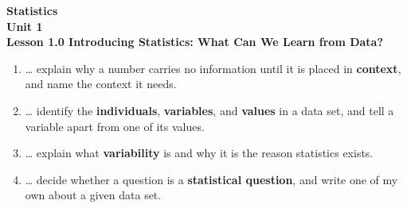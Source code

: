 \documentclass[10pt]{article}
\begin{document}
\vspace{-0.8in}

\begin{center}
  {\color{white}\textbf{\LARGE Statistics}}\\[4pt]
  {\color{skymid}\large\textbf{Unit 1}}\\[6pt]
  {\color{white}\textbf{\large Lesson 1.0 \quad Introducing Statistics: What Can We Learn from Data?}}
\end{center}

\vspace{0.22in}
\namedateperiod
\vspace{0.18in}

\boxguard[14]
\begin{learningtargetbox}
\small
\begin{enumerate}[leftmargin=1.5em, itemsep=5pt]
  \item \ldots{} explain why a number carries no information until it is placed in
        \textbf{context}, and name the context it needs.
  \item \ldots{} identify the \textbf{individuals}, \textbf{variables}, and \textbf{values}
        in a data set, and tell a variable apart from one of its values.
  \item \ldots{} explain what \textbf{variability} is and why it is the reason statistics
        exists.
  \item \ldots{} decide whether a question is a \textbf{statistical question}, and write one
        of my own about a given data set.
\end{enumerate}
\end{learningtargetbox}

\vspace{0.14in}
\end{document}
